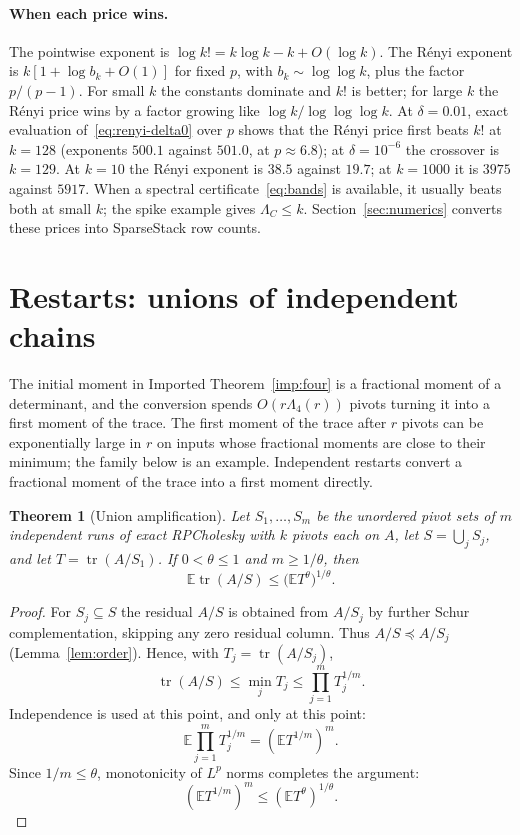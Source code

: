 \documentclass[11pt]{article}
\newtheorem{theorem}{Theorem}[section]
\theoremstyle{definition}\newtheorem{definition}[theorem]{Definition}
\theoremstyle{remark}\newtheorem{remark}[theorem]{Remark}
\newcommand{\E}{\mathbb E}
\newcommand{\tr}{\operatorname{tr}}
\newcommand{\1}{\mathbf 1}
\begin{document}
\paragraph{When each price wins.}
The pointwise exponent is $\log k!=k\log k-k+O(\log k)$. The R\'enyi
exponent is $k[1+\log b_k+O(1)]$ for fixed $p$, with
$b_k\sim\log\log k$, plus the factor $p/(p-1)$. For small $k$ the
constants dominate and $k!$ is better; for large $k$ the R\'enyi price
wins by a factor growing like $\log k/\log\log\log k$. At $\delta=0.01$,
exact evaluation of~\eqref{eq:renyi-delta0} over $p$ shows that the
R\'enyi price first beats $k!$ at $k=128$ (exponents $500.1$ against
$501.0$, at $p\approx6.8$); at $\delta=10^{-6}$ the crossover is $k=129$.
At $k=10$ the R\'enyi exponent is $38.5$ against $19.7$; at $k=1000$ it
is $3975$ against $5917$. When a spectral certificate~\eqref{eq:bands}
is available, it usually beats both at small $k$; the spike example
gives $\Lambda_C\le k$. Section~\ref{sec:numerics} converts these prices
into SparseStack row counts.
\section{Restarts: unions of independent chains}\label{sec:restart}
The initial moment in Imported Theorem~\ref{imp:four} is a fractional
moment of a determinant, and the conversion spends
$O(r\Lambda_4(r))$ pivots turning it into a first moment of the trace.
The first moment of the trace after $r$ pivots can be exponentially
large in $r$ on inputs whose fractional moments are close to their
minimum; the family below is an example. Independent restarts convert a
fractional moment of the trace into a first moment directly.

\begin{theorem}[Union amplification]\label{thm:restart}
Let $S_1,\dots,S_m$ be the unordered pivot sets of $m$ independent runs
of exact RPCholesky with $k$ pivots each on $A$, let $S=\bigcup_jS_j$, and
let $T=\tr(A/S_1)$. If $0<\theta\le1$ and $m\ge1/\theta$, then
\[
 \E\tr(A/S)\le\bigl(\E T^\theta\bigr)^{1/\theta}.
\]
\end{theorem}
\begin{proof}
For $S_j\subseteq S$ the residual $A/S$ is obtained from $A/S_j$ by
further Schur complementation, skipping any zero residual column. Thus $A/S\preceq A/S_j$
(Lemma~\ref{lem:order}). Hence, with $T_j=\tr(A/S_j)$,
\[
 \tr(A/S)\le\min_jT_j\le\prod_{j=1}^mT_j^{1/m}.
\]
Independence is used at this point, and only at this point:
\[
 \E\prod_{j=1}^mT_j^{1/m}=(\E T^{1/m})^m.
\]
Since $1/m\le\theta$, monotonicity of $L^p$ norms completes the argument:
\[
 (\E T^{1/m})^m\le(\E T^\theta)^{1/\theta}.
\]
\end{proof}
\end{document}
